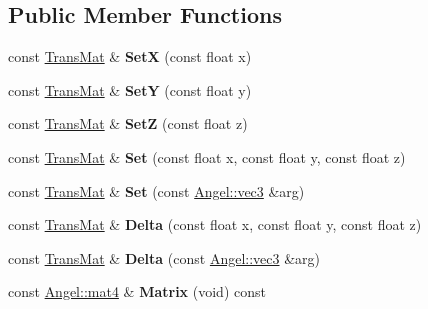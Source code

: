 \subsection*{Public Member Functions}
\begin{DoxyCompactItemize}
\item 
\hypertarget{class_trans_mat_a0a06e0dbfa09be06f0b8057283904b61}{const \hyperlink{class_trans_mat}{Trans\-Mat} \& {\bfseries Set\-X} (const float x)}\label{class_trans_mat_a0a06e0dbfa09be06f0b8057283904b61}

\item 
\hypertarget{class_trans_mat_a06c565961177be6b4945899d099eb7bc}{const \hyperlink{class_trans_mat}{Trans\-Mat} \& {\bfseries Set\-Y} (const float y)}\label{class_trans_mat_a06c565961177be6b4945899d099eb7bc}

\item 
\hypertarget{class_trans_mat_a9eaca6a2622a5820ee996409c477a54e}{const \hyperlink{class_trans_mat}{Trans\-Mat} \& {\bfseries Set\-Z} (const float z)}\label{class_trans_mat_a9eaca6a2622a5820ee996409c477a54e}

\item 
\hypertarget{class_trans_mat_a674c38b07b3f30ca46fdad9b3e699b77}{const \hyperlink{class_trans_mat}{Trans\-Mat} \& {\bfseries Set} (const float x, const float y, const float z)}\label{class_trans_mat_a674c38b07b3f30ca46fdad9b3e699b77}

\item 
\hypertarget{class_trans_mat_a5d6ab266be86788df753e5457afbe461}{const \hyperlink{class_trans_mat}{Trans\-Mat} \& {\bfseries Set} (const \hyperlink{struct_angel_1_1vec3}{Angel\-::vec3} \&arg)}\label{class_trans_mat_a5d6ab266be86788df753e5457afbe461}

\item 
\hypertarget{class_trans_mat_acaca3bb158b497ae5924fda662ff324d}{const \hyperlink{class_trans_mat}{Trans\-Mat} \& {\bfseries Delta} (const float x, const float y, const float z)}\label{class_trans_mat_acaca3bb158b497ae5924fda662ff324d}

\item 
\hypertarget{class_trans_mat_a1ba9395450677744c7c86d98f2d094d8}{const \hyperlink{class_trans_mat}{Trans\-Mat} \& {\bfseries Delta} (const \hyperlink{struct_angel_1_1vec3}{Angel\-::vec3} \&arg)}\label{class_trans_mat_a1ba9395450677744c7c86d98f2d094d8}

\item 
\hypertarget{class_transformation_ae6a57a1ee74ca1da1b8aef3d328a8772}{const \hyperlink{class_angel_1_1mat4}{Angel\-::mat4} \& {\bfseries Matrix} (void) const }\label{class_transformation_ae6a57a1ee74ca1da1b8aef3d328a8772}


\end{DoxyCompactItemize}
